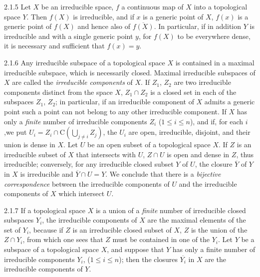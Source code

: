 \documentclass[10pt,oneside]{book}
\begin{document}
\begin{env}{2.1.5}
\label{env-0.2.1.5}
Let $X$ be an irreducible space, $f$ a continuous map of $X$ into a topological space $Y$.
Then $f(X)$ is irreducible, and if $x$ is a generic point of $X$, $f(x)$ is a generic point
of $f(X)$ and hence also of $\overline{f(X)}$. In particular, if in addition $Y$ is
irreducible and with a single generic point $y$, for $f(X)$ to be everywhere dense, it is
necessary and sufficient that $f(x)=y$.
\end{env}

\begin{env}{2.1.6}
\label{env-0.2.1.6}
Any irreducible subspace of a topological space $X$ is contained in a maximal irreducible
subspace, which is necessarily closed. Maximal irreducible subspaces of $X$ are called the
\emph{irreducible components} of $X$. If $Z_1$, $Z_2$ are two irreducible components distinct
from the space $X$, $Z_1\cap Z_2$ is a closed  set in each of the
subspaces $Z_1$, $Z_2$; in particular, if an irreducible component of $X$ admits a generic
point  such a point can not belong to any other irreducible component. If
$X$ has only a \emph{finite} number of irreducible components $Z_i$
($1\leqslant i\leqslant n$), and if, for each $i$,we put
$U_i=Z_i\cap\mathrm{C}(\bigcup_{j\neq i}Z_j)$, the $U_i$ are open, irreducible, disjoint,
and their union is dense in $X$. Let $U$ be an open subset of a topological space $X$. If $Z$
is an irreducible subset of $X$ that intersects with $U$, $Z\cap U$ is open and dense in $Z$,
thus irreducible; conversely, for any irreducible closed subset $Y$ of $U$, the closure
$\overline{Y}$ of $Y$ in $X$ is irreducible and $\overline{Y}\cap U=Y$. We conclude that
there is a \emph{bijective correspondence} between the irreducible components of $U$ and the
irreducible components of $X$ which intersect $U$.
\end{env}

\begin{env}{2.1.7}
\label{env-0.2.1.7}
If a topological space $X$ is a union of a \emph{finite} number of irreducible closed
subspaces $Y_i$, the irreducible components of $X$ are the maximal elements of the set of
$Y_i$, because if $Z$ is an irreducible closed subset of $X$, $Z$ is the union of the
$Z\cap Y_i$, from which one sees that $Z$ must be contained in one of the $Y_i$. Let $Y$ be a
subspace of a topological space $X$, and suppose that $Y$ has only a finite number of
irreducible components $Y_i$, ($1\leqslant i\leqslant n$); then the closures $\overline{Y_i}$
in $X$ are the irreducible components of $Y$.
\end{env}
\end{document}

